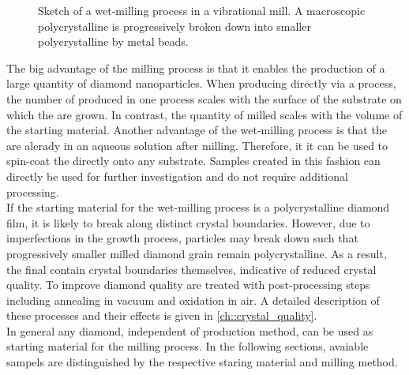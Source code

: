 	\begin{figure}[htp]
		\centering
		\caption[Wet-milling in a vibrational mill]{Sketch of a wet-milling process in a vibrational mill. A macroscopic polycrystalline \nd is progressively broken down into smaller polycrystalline \nds by metal beads.}\label{subfig::sketch_milling}
	\end{figure}

	The big advantage of the milling process is that it enables the production of a large quantity of diamond nanoparticles.
	When producing \nds directly via a \CVD process, the number of produced \nds in one process scales with the surface of the substrate on which the \nds are grown.
	In contrast, the quantity of milled \nds scales with the volume of the starting material.
	Another advantage of the wet-milling process is that the \nds are alerady in an aqueous solution after milling.
	Therefore, it it can be used to spin-coat the \nds directly onto any substrate. Samples created in this fashion can directly be used for further investigation and do not require additional processing.
	\\
	If the starting material for the wet-milling process is a polycrystalline diamond film, it is likely to break along distinct crystal boundaries.
	However, due to imperfections in the growth process, particles may break down such that progressively smaller milled diamond grain remain polycrystalline.
	As a result, the final \nds contain crystal boundaries themselves, indicative of reduced crystal quality.
	To improve diamond quality \nds are treated with post-processing steps including annealing in vacuum and oxidation in air.
	A detailed description of these processes and their effects is given in \autoref{ch::crystal_quality}.
	\\
	In general any diamond, independent of production method, can be used as starting material for the milling process.
	In the following sections, avaiable sampels are distinguished by the respective staring material and milling method.

